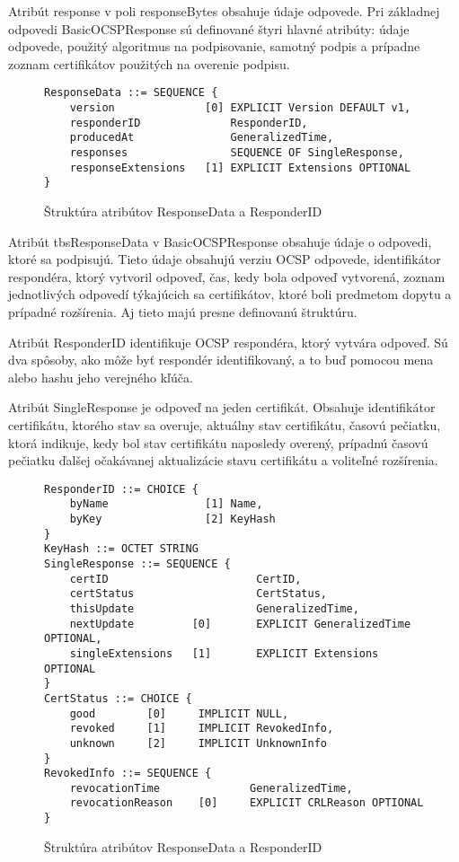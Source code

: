 \documentclass[12pt, twoside]{book}
\begin{document}
Atribút response v poli responseBytes obsahuje údaje odpovede. Pri základnej odpovedi BasicOCSPResponse sú definované štyri hlavné atribúty: údaje odpovede, použitý algoritmus na podpisovanie, samotný podpis a prípadne zoznam certifikátov použitých na overenie podpisu.\cite{rfc6960}

\begin{figure}[H]
\begin{lstlisting}
ResponseData ::= SEQUENCE {
    version              [0] EXPLICIT Version DEFAULT v1,
    responderID              ResponderID,
    producedAt               GeneralizedTime,
    responses                SEQUENCE OF SingleResponse,
    responseExtensions   [1] EXPLICIT Extensions OPTIONAL
}
\end{lstlisting}
\caption{Štruktúra atribútov ResponseData a ResponderID}
\end{figure}

Atribút tbsResponseData v BasicOCSPResponse obsahuje údaje o odpovedi, ktoré sa podpisujú. Tieto údaje obsahujú verziu  OCSP odpovede, identifikátor respondéra, ktorý vytvoril odpoveď,  čas, kedy bola odpoveď vytvorená, zoznam jednotlivých odpovedí týkajúcich sa certifikátov, ktoré boli predmetom dopytu a prípadné rozšírenia. Aj tieto majú presne definovanú štruktúru.\cite{rfc6960}


Atribút ResponderID identifikuje OCSP respondéra, ktorý vytvára odpoveď. Sú dva spôsoby, ako môže byť respondér identifikovaný, a to buď pomocou mena alebo hashu jeho verejného kľúča.\cite{rfc6960}

Atribút SingleResponse je odpoveď na jeden certifikát. Obsahuje identifikátor certifikátu, ktorého stav sa overuje, aktuálny stav certifikátu, časovú pečiatku, ktorá indikuje, kedy bol stav certifikátu naposledy overený, prípadnú časovú pečiatku ďalšej očakávanej aktualizácie stavu certifikátu a voliteľné rozšírenia.\cite{rfc6960}

\begin{figure}[H]
\begin{lstlisting}
ResponderID ::= CHOICE {
    byName               [1] Name,
    byKey                [2] KeyHash
}
KeyHash ::= OCTET STRING 
SingleResponse ::= SEQUENCE {
    certID                       CertID,
    certStatus                   CertStatus,
    thisUpdate                   GeneralizedTime,
    nextUpdate         [0]       EXPLICIT GeneralizedTime OPTIONAL,
    singleExtensions   [1]       EXPLICIT Extensions OPTIONAL
}
CertStatus ::= CHOICE {
    good        [0]     IMPLICIT NULL,
    revoked     [1]     IMPLICIT RevokedInfo,
    unknown     [2]     IMPLICIT UnknownInfo
}
RevokedInfo ::= SEQUENCE {
    revocationTime              GeneralizedTime,
    revocationReason    [0]     EXPLICIT CRLReason OPTIONAL
}
\end{lstlisting}
\caption{Štruktúra atribútov ResponseData a ResponderID}
\end{figure}
\end{document}
